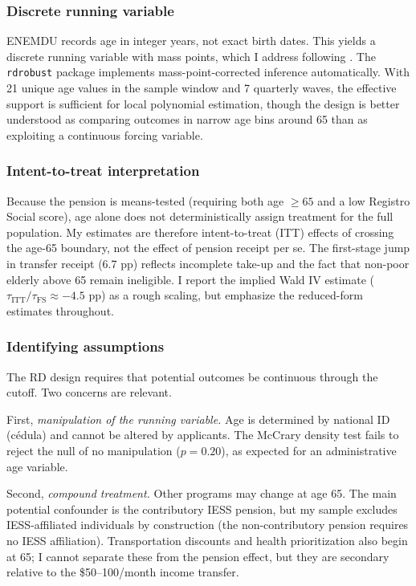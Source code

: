 \documentclass[12pt]{article}
\begin{document}
\subsubsection*{Discrete running variable} ENEMDU records age in integer years, not exact birth dates. This yields a discrete running variable with mass points, which I address following \citet{cattaneo2023}. The \texttt{rdrobust} package implements mass-point-corrected inference automatically. With 21 unique age values in the sample window and 7 quarterly waves, the effective support is sufficient for local polynomial estimation, though the design is better understood as comparing outcomes in narrow age bins around 65 than as exploiting a continuous forcing variable.

\subsubsection*{Intent-to-treat interpretation} Because the pension is means-tested (requiring both age $\geq 65$ and a low Registro Social score), age alone does not deterministically assign treatment for the full population. My estimates are therefore intent-to-treat (ITT) effects of crossing the age-65 boundary, not the effect of pension receipt per se. The first-stage jump in transfer receipt (6.7 pp) reflects incomplete take-up and the fact that non-poor elderly above 65 remain ineligible. I report the implied Wald IV estimate ($\tau_{\text{ITT}} / \tau_{\text{FS}} \approx -4.5$ pp) as a rough scaling, but emphasize the reduced-form estimates throughout.

\subsubsection*{Identifying assumptions} The RD design requires that potential outcomes be continuous through the cutoff. Two concerns are relevant.

First, \textit{manipulation of the running variable.} Age is determined by national ID (c\'{e}dula) and cannot be altered by applicants. The McCrary density test fails to reject the null of no manipulation ($p = 0.20$), as expected for an administrative age variable.

Second, \textit{compound treatment.} Other programs may change at age 65. The main potential confounder is the contributory IESS pension, but my sample excludes IESS-affiliated individuals by construction (the non-contributory pension requires no IESS affiliation). Transportation discounts and health prioritization also begin at 65; I cannot separate these from the pension effect, but they are secondary relative to the \$50--100/month income transfer.
\end{document}

